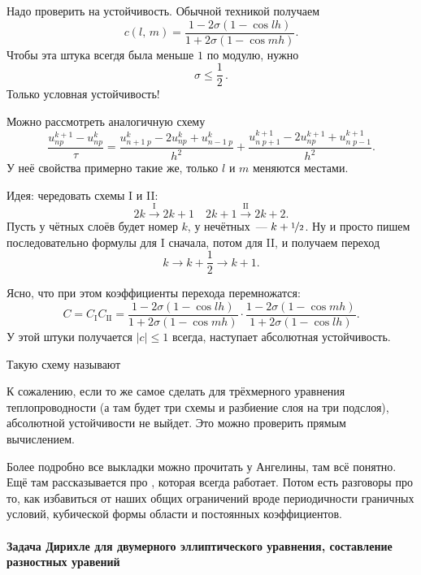\documentclass{trlnotes}
\begin{document}
Надо проверить на устойчивость. Обычной техникой получаем
\[
	c(l, \, m) = \dfrac{1 - 2\sigma(1 - \cos lh)}{1 + 2\sigma(1 - \cos mh)}.
\]
Чтобы эта штука всегдя была меньше $1$ по модулю, нужно
\[
	\boxed{\sigma \leqslant \dfrac{1}{2}}\,.
\]
Только условная устойчивость!

Можно рассмотреть аналогичную схему
\[
	\dfrac{u^{k+1}_{np} - u^{k}_{np}}{\tau} = \dfrac{u^{k}_{n+1 \; p} - 2u^{k}_{np} + u^{k}_{n-1 \; p}}{h^2} + \dfrac{u^{k+1}_{n \; p+1} - 2u^{k+1}_{np} + u^{k+1}_{n \; p - 1}}{h^2}.
\]
У неё свойства примерно такие же, только $l$ и $m$ меняются местами.

Идея: чередовать схемы I и II:
\[
	2k \xrightarrow{\text{I}} 2k+1 \quad 2k+1 \xrightarrow{\text{II}} 2k+2.
\]
Пусть у чётных слоёв будет номер $k$, у нечётных~--- $k + \nicefrac{1}{2}$. Ну и просто пишем последовательно формулы для I сначала, потом для II, и получаем переход
\[
	k \to k+ \frac{1}{2} \to k+1.
\]

Ясно, что при этом коэффициенты перехода перемножатся:
\[
	C = C_{\text{I}} C_{\text{II}} = \dfrac{1 - 2\sigma(1 - \cos lh)}{1 + 2\sigma(1 - \cos mh)} \cdot \dfrac{1 - 2\sigma(1 - \cos mh)}{1 + 2\sigma(1 - \cos lh)}.
\]
У этой штуки получается $|c| \leqslant 1$ всегда, наступает абсолютная устойчивость.

Такую схему называют 

\begin{rem}
	К сожалению, если то же самое сделать для трёхмерного уравнения теплопроводности (а там будет три схемы и разбиение слоя на три подслоя), абсолютной устойчивости не выйдет. Это можно проверить прямым вычислением.
\end{rem}

\begin{rem}
	Более подробно все выкладки можно прочитать у Ангелины, там всё понятно. Ещё там рассказывается про , которая всегда работает. Потом есть разговоры про то, как избавиться от наших общих ограничений вроде периодичности граничных условий, кубической формы области и постоянных коэффициентов.
\end{rem}



\paragraph{Задача Дирихле для двумерного эллиптического уравнения, составление разностных уравений}
\label{par:pde::elldirprobl}
\end{document}

